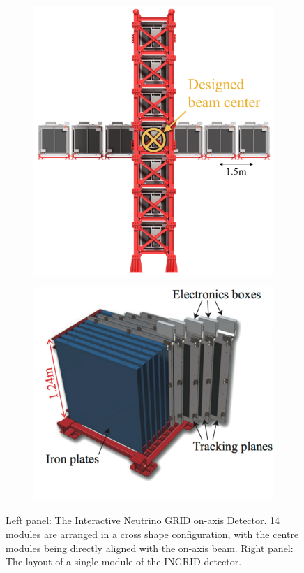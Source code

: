 \begin{figure}[h]
  \begin{subfigure}[t]{0.45\textwidth}
    \includegraphics[width=\textwidth, trim={0mm 0mm 0mm 0mm}, clip,page=1]{Figures/Detectors/T2KINGRIDDiagram.pdf}
  \end{subfigure}%
  \begin{subfigure}[t]{0.55\textwidth}
    \includegraphics[width=\textwidth, trim={0mm 0mm 0mm 0mm}, clip,page=1]{Figures/Detectors/T2KINGRIDModule.pdf}
  \end{subfigure}%
  \caption{Left panel: The Interactive Neutrino GRID on-axis Detector. 14 modules are arranged in a cross shape configuration, with the centre modules being directly aligned with the on-axis beam. Right panel: The layout of a single module of the INGRID detector.}
  \label{fig:T2KSKExp_T2K_INGRID}
\end{figure}

